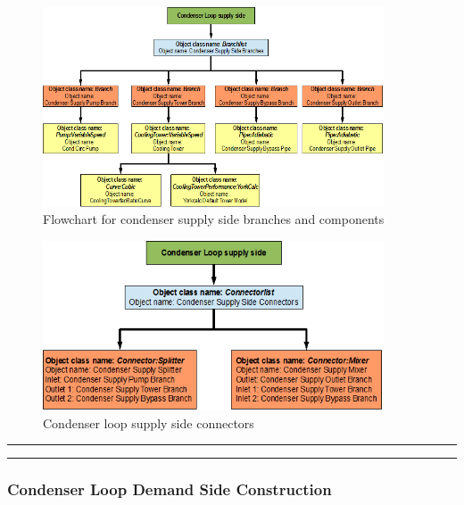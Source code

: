 \begin{figure}[hbtp] %
\centering
\includegraphics[width=0.9\textwidth, height=0.9\textheight, keepaspectratio=true]{media/image032.png}
\caption{Flowchart for condenser supply side branches and components \protect \label{fig:flowchart-for-condenser-supply-side-branches}}
\end{figure}

\begin{figure}[hbtp] %
\centering
\includegraphics[width=0.9\textwidth, height=0.9\textheight, keepaspectratio=true]{media/image033.png}
\caption{Condenser loop supply side connectors \protect \label{fig:condenser-loop-supply-side-connectors}}
\end{figure}

\begin{center}\rule{0.5\linewidth}{0.4pt}\end{center}

\begin{center}\rule{0.5\linewidth}{0.4pt}\end{center}

\subsubsection{Condenser Loop Demand Side Construction}\label{condenser-loop-demand-side-construction-001}


